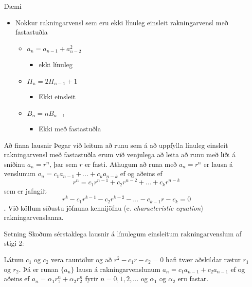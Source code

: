 \documentclass[handout]{beamer}
\begin{document}
\begin{frame}{Dæmi}
\begin{itemize}
 \item Nokkur rakningarvensl sem eru ekki línuleg einsleit rakningarvensl með fastastuðla
 \begin{itemize}[<+->]
  \item $a_n = a_{n-1} + a_{n-2}^2$
  \begin{itemize}
   \item ekki línuleg
  \end{itemize}
  \item $H_n = 2H_{n-1} + 1$
  \begin{itemize}
   \item Ekki einsleit
  \end{itemize}
  \item $B_n = nB_{n-1}$
  \begin{itemize}
   \item Ekki með fastastuðla
  \end{itemize}
 \end{itemize}
\end{itemize}
\end{frame}

\begin{frame}{Að finna lausnir}
Þegar við leitum að runu sem á að uppfylla línuleg einsleit rakningarvensl með fastastuðla erum við venjulega að leita að runu með liði á sniðinu $a_n = r^n$, þar sem $r$ er fasti. Athugum að runa með $a_n = r^n$ er lausn á venslunum $ a_n = c_1 a_{n-1} + \ldots + c_ka_{n-k}$ ef og aðeins ef
\[
 r^n = c_1r^{n-1} + c_2r^{n-2} + \ldots + c_kr^{n-k}
\]
sem er jafngilt
\[
 r^k - c_1r^{k-1} - c_2r^{k-2} - \ldots - c_{k-1}r - c_k = 0
\]
. Við köllum síðustu jöfnuna kennijöfnu (e. \emph{characteristic equation}) rakningarvenslanna.
\end{frame}

\begin{frame}{Setning}
Skoðum sérstaklega lausnir á línulegum einsleitum rakningarvenslum af stigi 2:
\begin{tcolorbox}[title=Lausn einfaldra rakningarvensla af stigi 2]
Látum $c_1$ og $c_2$ vera rauntölur og að $r^2 - c_1r - c_2 = 0$ hafi tvær aðskildar rætur $r_1$ og $r_2$. Þá er runan $\{a_n\}$ lausn á rakningarvenslunum $a_n = c_1a_{n-1} + c_2a_{n-1}$ ef og aðeins ef $a_n = \alpha_1r_1^n + \alpha_2r^n_2$ fyrir $n=0,1,2,\ldots$ og $\alpha_1$ og $\alpha_2$ eru fastar.
\end{tcolorbox}

\end{frame}
\end{document}

